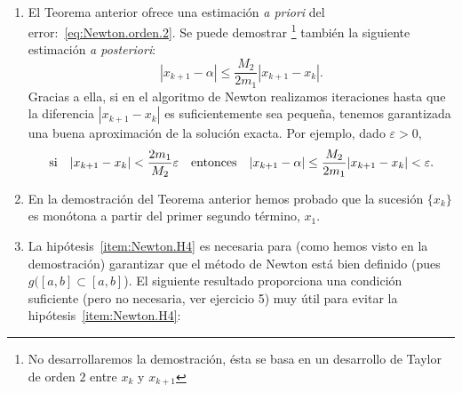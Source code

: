 \begin{remark}~
  \label{rk:4}
  \begin{enumerate}
  \item El Teorema anterior ofrece una estimación \textit{a
      priori} del error:~\eqref{eq:Newton.orden.2}.  Se puede demostrar%
    \footnote{No desarrollaremos la demostración, ésta se basa
    en un desarrollo de Taylor de orden $2$ entre $x_k$ y
    $x_{k+1}$} también
    la siguiente estimación \textit{a posteriori}:
    \begin{equation}
      |x_{k+1}-\alpha| \le \frac{M_2}{2m_1}|x_{k+1}-x_k|.
      \label{eq:newton.estimac.a.posteriori}
    \end{equation}
    Gracias a ella, si en el algoritmo de Newton realizamos
    iteraciones hasta que la diferencia $|x_{k+1}-x_k|$ es
    suficientemente sea pequeña, tenemos garantizada una buena
    aproximación de la solución exacta. Por ejemplo, dado
    $\varepsilon>0$,
    $$
    \text{si}\quad
    |x_{k+1}-x_k| < \frac{2m_1}{M_2} \varepsilon
    \quad\text{entonces}\quad
    |x_{k+1}-\alpha| \le \frac{M_2}{2m_1}|x_{k+1}-x_k|<\varepsilon.
    $$
  \item En la demostración del Teorema anterior hemos probado que la
    sucesión $\{x_k\}$ es monótona a partir del primer segundo
    término, $x_1$. %
  \item La hipótesis~\ref{item:Newton.H4} es necesaria para (como
    hemos visto en la demostración) garantizar que el método de Newton
    está bien definido (pues $g([a,b]\subset [a,b]$).  El siguiente
    resultado proporciona una condición suficiente (pero no necesaria,
    ver ejercicio 5) muy útil para evitar la
    hipótesis~\ref{item:Newton.H4}:
  \end{enumerate}
\end{remark}

